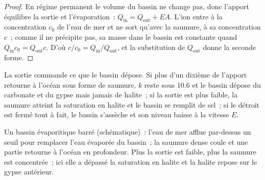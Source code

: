\begin{proof}
En régime permanent le volume du bassin ne change pas, donc l'apport
équilibre la sortie et l'évaporation~: $Q_{\mathrm{in}} = Q_{\mathrm{out}} +
EA$. L'ion entre à la concentration $c_0$ de l'eau de mer et ne sort qu'avec
la saumure, à sa concentration $c$~; comme il ne précipite pas, sa masse dans
le bassin est constante quand $Q_{\mathrm{in}}c_0 = Q_{\mathrm{out}}c$. D'où $c/c_0 =
Q_{\mathrm{in}}/Q_{\mathrm{out}}$, et la substitution de $Q_{\mathrm{out}}$ donne la
seconde forme.
\end{proof}

La sortie commande ce que le bassin dépose. Si plus d'un dixième de
l'apport retourne à l'océan sous forme de saumure, $k$ reste sous 10.6 et le bassin dépose
du carbonate et du gypse mais jamais de halite~; si la sortie est plus faible, la
saumure atteint la saturation en halite et le bassin se remplit de sel~; si le détroit est
fermé tout à fait, le bassin s'assèche et son niveau baisse à la vitesse $E$.

\begin{omfigure}

{\small Un bassin évaporitique barré (schématique)~: l'eau de mer afflue par-dessus un seuil pour
remplacer l'eau évaporée du bassin~; la saumure dense coule et une partie
retourne à l'océan en profondeur. Plus la sortie est faible, plus la
saumure est concentrée~; ici elle a dépassé la saturation en halite et la halite repose
sur le gypse antérieur.}
\label{fig:b1:chemical-biogenic-sediments:barred}
\end{omfigure}


